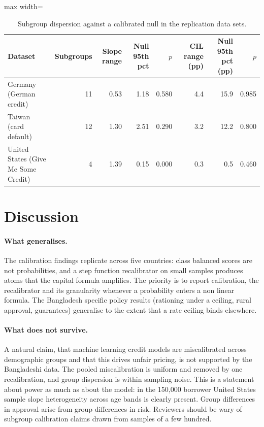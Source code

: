 \documentclass[11pt,a4paper]{article}
\newcommand{\tabsize}{\footnotesize}
\begin{document}
\begin{table}[H]\centering\tabsize\caption{Subgroup dispersion against a calibrated null in the replication data sets.}\label{tab:extnull}
\begin{adjustbox}{max width=\textwidth}
\begin{tabular}{lrrrrrrr}
\toprule
Dataset & Subgroups & Slope range & Null 95th pct & $p$ & CIL range (pp) & Null 95th pct (pp) & $p$ \\
\midrule
Germany (German credit) & 11 & 0.53 & 1.18 & 0.580 & 4.4 & 15.9 & 0.985 \\
Taiwan (card default) & 12 & 1.30 & 2.51 & 0.290 & 3.2 & 12.2 & 0.800 \\
United States (Give Me Some Credit) & 4 & 1.39 & 0.15 & 0.000 & 0.3 & 0.5 & 0.460 \\
\bottomrule
\end{tabular}
\end{adjustbox}\end{table}

\section{Discussion}\label{sec:disc}
\paragraph{What generalises.} The calibration findings replicate across five countries: class balanced scores are not probabilities, and a step function recalibrator on small samples produces atoms that the capital formula amplifies. The priority is to report calibration, the recalibrator and its granularity whenever a probability enters a non linear formula. The Bangladesh specific policy results (rationing under a ceiling, rural approval, guarantees) generalise to the extent that a rate ceiling binds elsewhere.

\paragraph{What does not survive.} A natural claim, that machine learning credit models are miscalibrated across demographic groups and that this drives unfair pricing, is not supported by the Bangladeshi data. The pooled miscalibration is uniform and removed by one recalibration, and group dispersion is within sampling noise. This is a statement about power as much as about the model: in the 150{,}000 borrower United States sample slope heterogeneity across age bands is clearly present. Group differences in approval arise from group differences in risk. Reviewers should be wary of subgroup calibration claims drawn from samples of a few hundred.
\end{document}
